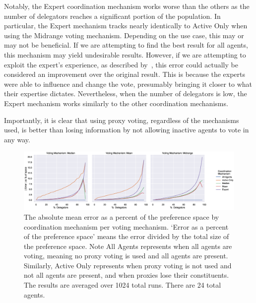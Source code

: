 Notably, the Expert coordination mechanism works worse than the others as the number
of delegators reaches a significant portion of the population.
In particular, the Expert mechanism tracks nearly identically to Active Only when
using the Midrange voting mechanism.
Depending on the use case, this may or may not be beneficial.
If we are attempting to find the best result for all agents, this mechanism may yield
undesirable results.
However, if we are attempting to exploit the expert's experience, as described
by~\cite{Miller1969}, this error could actually be considered an improvement over
the original result.
This is because the experts were able to influence and change the vote, presumably
bringing it closer to what their expertise dictates.
Nevertheless, when the number of delegators is low, the Expert mechanism works
similarly to the other coordination mechanisms.

Importantly, it is clear that using proxy voting, regardless of the mechanisms used,
is better than losing information by not allowing inactive agents to vote in any way.

\begin{landscape}
    \begin{figure}[p]
        \centering
        \includegraphics[scale=0.55]
        {content/chapter2/figures/vm_col_cm_hue_error_as_percent_of_space_abs_mean}
        \caption{
            The absolute mean error as a percent of the preference space by
            coordination mechanism per voting mechanism.
            `Error as a percent of the preference space' means the error divided by
            the total size of the preference space.
            Note All Agents represents when all agents are voting, meaning no proxy
            voting is used and all agents are present.
            Similarly, Active Only represents when proxy voting is not used and not
            all agents are present, and when proxies lose their constituents.
            The results are averaged over 1024 total runs.
            There are 24 total agents.
        }
        \label{fig:vm-col-cm-hue-error-as-percent-of-space-abs-mean}
    \end{figure}
\end{landscape}

